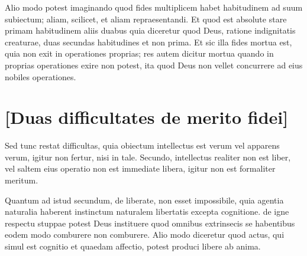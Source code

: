 \documentclass{article}
\begin{document}
        \pstart
        Alio modo potest  imaginando quod fides multiplicem habet habitudinem ad suum subiectum;  aliam, scilicet,  et aliam repraesentandi. Et   quod  est absolute stare primam habitudinem aliis duabus  quia diceretur quod Deus, ratione indignitatis creaturae,  duas secundas habitudines et non prima. Et sic illa fides mortua est, quia non exit in operationes  proprias;  res autem dicitur mortua quando in proprias operationes exire non potest, ita quod Deus non vellet concurrere ad eius nobiles operationes.
        \pend
      
        \bigskip
         \section*{ [Duas difficultates de merito fidei] } 
        \pstart
        Sed tunc restat difficultas, quia obiectum intellectus est verum vel apparens verum, igitur non fertur, nisi in tale. Secundo, intellectus realiter non est liber, vel saltem eius operatio non est immediate libera, igitur non est formaliter meritum.
        \pend
     
        \pstart
        Quantum ad istud secundum, de liberate, non esset impossibile, quia agentia naturalia haberent instinctum naturalem libertatis excepta cognitione.  de igne respectu stuppae potest Deus instituere quod omnibus extrinsecis  se habentibus eodem modo  comburere  non comburere. Alio modo diceretur quod actus, qui simul est cognitio et quaedam affectio,  potest produci libere ab anima.
        \pend
     
\end{document}
